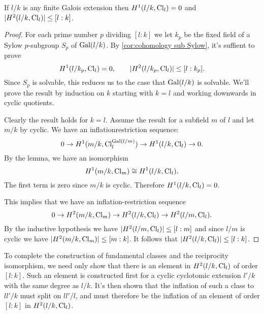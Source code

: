 \begin{theorem}
	If $l/k$ is any finite Galois extension then $H^1(l/k, \mathrm{Cl}_{l}) = 0$
	and $|H^2(l/k, \mathrm{Cl}_{l})| \le [l:k]$.
\end{theorem}


\begin{proof}
	For each prime number $p$ dividing $[l:k]$ we let $k_p$ be the fixed
	field of a Sylow $p$-subgroup $S_p$ of $\mathrm{Gal}(l/k)$.
	By \ref{cor:cohomology sub Sylow}, it's suffient to prove
	\[
		H^1(l/k_p, \mathrm{Cl}_{l}) = 0, \qquad
		|H^2(l/k_p, \mathrm{Cl}_{l})| \le [l:k_p].
	\]
	Since $S_p$ is solvable, this reduces us to the case that $\mathrm{Gal}(l/k)$ is solvable.
	We'll prove the result by induction on $k$ starting with $k=l$ and working downwards
	in cyclic quotients.

	Clearly the result holds for $k=l$.
	Assume the result for a subfield $m$ of $l$ and let $m/k$ by cyclic.
	We have an inflationrestriction sequence:
	\[
		0 \to H^1(m/k, \mathrm{Cl}_{l}^{\mathrm{Gal}(l/m)}) \to H^1(l/k, \mathrm{Cl}_{l}) \to 0.
	\]
	By the lemma, we have an isomorphism
	\[
		H^1(m/k, \mathrm{Cl}_{m}) \cong H^1(l/k, \mathrm{Cl}_{l}) .
	\]
	The first term is zero since $m/k$ is cyclic.
	Therefore $H^1(l/k,\mathrm{Cl}_l)=0$.

	This implies that we have an inflation-restriction sequence
	\[
		0 \to H^2(m/k, \mathrm{Cl}_m) \to H^2(l/k, \mathrm{Cl}_l) \to H^2(l/m,\mathrm{Cl}_l).
	\]
	By the inductive hypothesis we have $|H^2(l/m,\mathrm{Cl}_l)| \le [l:m]$
	and since $l/m$ is cyclic we have $|H^2(m/k, \mathrm{Cl}_m)| \le [m : k]$.
	It follows that $|H^2(l/k,\mathrm{Cl}_l)| \le [l : k]$.
\end{proof}


To complete the construction of fundamental classes and the reciprocity isomorphism,
we need only show that there is an element in $H^2(l/k,\mathrm{Cl}_l)$ of order $[l:k]$.
Such an element is constructed first for a cyclic cyclotomic extension $l'/k$ with the same degree
as $l/k$.
It's then shown that the inflation of such a class to $ll'/k$ must split on $ll'/l$,
and must therefore be the inflation of an element of order $[l:k]$ in $H^2(l/k,\mathrm{Cl}_l)$.
